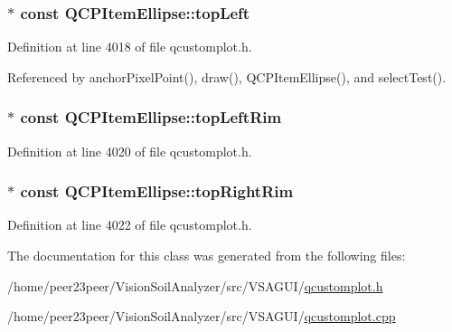 \subsubsection[{top\+Left}]{$\ast$ const Q\+C\+P\+Item\+Ellipse\+::top\+Left}\label{class_q_c_p_item_ellipse_a12fd8420c06718d0c8a2303d6a652848}


Definition at line 4018 of file qcustomplot.\+h.



Referenced by anchor\+Pixel\+Point(), draw(), Q\+C\+P\+Item\+Ellipse(), and select\+Test().

\hypertarget{class_q_c_p_item_ellipse_a33ebd2a751b63b9240edc9aa46c19eff}{}
\subsubsection[{top\+Left\+Rim}]{$\ast$ const Q\+C\+P\+Item\+Ellipse\+::top\+Left\+Rim}\label{class_q_c_p_item_ellipse_a33ebd2a751b63b9240edc9aa46c19eff}


Definition at line 4020 of file qcustomplot.\+h.

\hypertarget{class_q_c_p_item_ellipse_a744446970b38a4a3bbea46d722b7c54d}{}
\subsubsection[{top\+Right\+Rim}]{$\ast$ const Q\+C\+P\+Item\+Ellipse\+::top\+Right\+Rim}\label{class_q_c_p_item_ellipse_a744446970b38a4a3bbea46d722b7c54d}


Definition at line 4022 of file qcustomplot.\+h.



The documentation for this class was generated from the following files\+:\begin{DoxyCompactItemize}
\item 
/home/peer23peer/\+Vision\+Soil\+Analyzer/src/\+V\+S\+A\+G\+U\+I/\hyperlink{qcustomplot_8h}{qcustomplot.\+h}\item 
/home/peer23peer/\+Vision\+Soil\+Analyzer/src/\+V\+S\+A\+G\+U\+I/\hyperlink{qcustomplot_8cpp}{qcustomplot.\+cpp}\end{DoxyCompactItemize}
